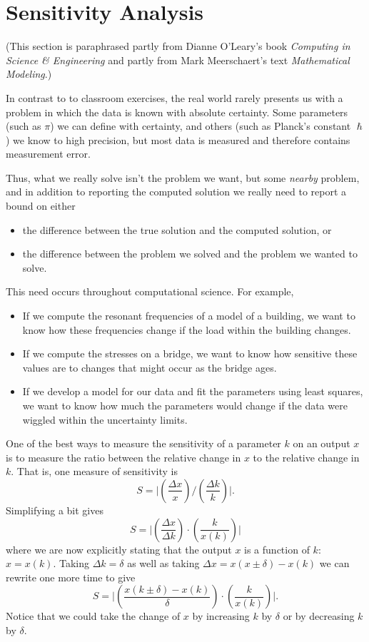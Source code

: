 \section{Sensitivity Analysis}
\noindent (This section is paraphrased partly from Dianne O'Leary's book \emph{Computing
in Science \& Engineering} and partly from Mark Meerschaert's text \emph{Mathematical
Modeling}.) 

In contrast to to classroom exercises, the real world rarely presents us with a problem in
which the data is known with absolute certainty.  Some parameters (such as $\pi$) we can
define with certainty, and others (such as Planck's constant $\hslash$) we know to high
precision, but most data is measured and therefore contains measurement error.  

Thus, what we really solve isn't the problem we want, but some {\it nearby} problem, and in
addition to reporting the computed solution we really need to report a bound on either
\begin{itemize}
    \item the difference between the true solution and the computed solution, or
    \item the difference between the problem we solved and the problem we wanted to solve. 
\end{itemize}
This need occurs throughout computational science.  For example,
\begin{itemize}
    \item If we compute the resonant frequencies of a model of a building, we want to know
        how these frequencies change if the load within the building changes.
    \item If we compute the stresses on a bridge, we want to know how sensitive these
        values are to changes that might occur as the bridge ages.
    \item If we develop a model for our data and fit the parameters using least squares,
        we want to know how much the parameters would change if the data were wiggled
        within the uncertainty limits.
\end{itemize}

One of the best ways to measure the sensitivity of a parameter $k$ on an output $x$ is to
measure the ratio between the relative change in $x$ to the relative change in $k$.  That
is, one measure of sensitivity is
\[ S = \Big| \left( \frac{\Delta x}{x} \right) \Big/ \left( \frac{\Delta k}{k} \right)
    \Big|. \]
Simplifying a bit gives
\[ S = \Big| \left( \frac{\Delta x}{\Delta k} \right) \cdot \left( \frac{k}{x(k)} \right)
    \Big| \]
where we are now explicitly stating that the output $x$ is a function of $k$: $x=x(k)$.  
Taking $\Delta k = \delta$ as well as taking $\Delta x = x(x\pm\delta)-x(k)$ we can rewrite
one more time to give
\[ S = \Big|\left( \frac{x(k\pm\delta)-x(k)}{\delta} \right) \cdot \left( \frac{k}{x(k)}
    \right) \Big|.  \]
Notice that we could take the change of $x$ by increasing $k$ by $\delta$ or
by decreasing $k$ by $\delta$.

